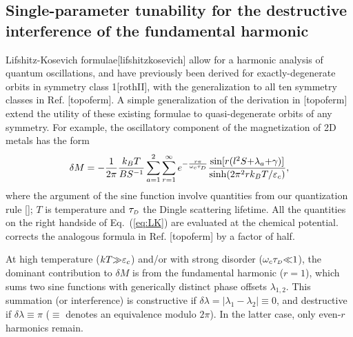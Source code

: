 \documentclass[aps, prb, showpacs, twocolumn, notitlepage, superscriptaddress]{revtex4-1}
\begin{document}


\subsection{Single-parameter tunability for the destructive interference of the fundamental harmonic}\label{sec:quantosc_equidis}


Lifshitz-Kosevich formulae[lifshitzkosevich] allow for a harmonic analysis of quantum oscillations, and have previously been derived for  exactly-degenerate orbits in symmetry class 1[rothII], with the generalization to all ten symmetry classes in Ref. [topoferm]. A simple generalization of the derivation in [topoferm] extend the utility of these existing formulae to quasi-degenerate orbits of any symmetry. For example, the oscillatory component of the magnetization of 2D metals has the form
\begin{equation}
\delta M=-\frac{1}{2\pi}\frac{k_BT}{BS^{-1}}\sum_{a=1}^2\sum_{r=1}^{\infty}e^{-\frac{r\pi}{\omega_c\tau_{\scriptscriptstyle{D}}}} \frac{\text{sin}[r(l^2S{+}\lambda_a{+}\gamma)]}{\text{sinh}(2\pi^2rk_BT/\varepsilon_c)},\label{eq:LK}
\end{equation}
where the argument of the sine function involve quantities from our  quantization rule []; $T$ is temperature and $\tau_{\scriptscriptstyle{D}}$  the Dingle scattering lifetime. All the quantities on the right handside of Eq.\ (\ref{eq:LK}) are evaluated at the chemical potential.  corrects the analogous formula in Ref. [topoferm] by a factor of half. 


At high temperature ($kT{\gg}\varepsilon_c$) and/or with strong disorder ($\omega_c\tau_{\scriptscriptstyle{D}}{\ll}1$), the dominant contribution to $\delta M$ is from the fundamental harmonic ($r{=}1$), which sums two sine functions with generically distinct phase offsets $\lambda_{1,2}$. This summation (or interference) is constructive if $\delta \lambda{=}|\lambda_1{-}\lambda_2|{\equiv}0$, and destructive if $\delta \lambda{\equiv}\pi$  ($\equiv$ denotes an equivalence modulo $2\pi$). In the latter case, only even-$r$ harmonics remain. 
\end{document}
